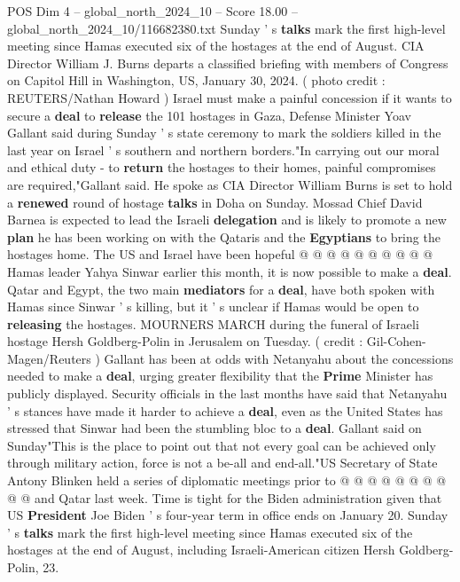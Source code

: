 \begin{textsample}{POS Dim 4 – global\_north\_2024\_10 – Score 18.00 – global\_north\_2024\_10/116682380.txt}  \label{ex:f4_pos_405}
Sunday ' s \textbf{talks} mark the first high-level meeting since Hamas executed six of the hostages at the end of August.
CIA Director William J.
Burns departs a classified briefing with members of Congress on Capitol Hill in Washington, US, January 30, 2024. ( photo credit : REUTERS/Nathan Howard ) Israel must make a painful concession if it wants to secure a \textbf{deal} to \textbf{release} the 101 hostages in Gaza, Defense Minister Yoav Gallant said during Sunday ' s state ceremony to mark the soldiers killed in the last year on Israel ' s southern and northern borders."In carrying out our moral and ethical duty - to \textbf{return} the hostages to their homes, painful compromises are required,"Gallant said.
He spoke as CIA Director William Burns is set to hold a \textbf{renewed} round of hostage \textbf{talks} in Doha on Sunday.
Mossad Chief David Barnea is expected to lead the Israeli \textbf{delegation} and is likely to promote a new \textbf{plan} he has been working on with the Qataris and the \textbf{Egyptians} to bring the hostages home.
The US and Israel have been hopeful @ @ @ @ @ @ @ @ @ @ Hamas leader Yahya Sinwar earlier this month, it is now possible to make a \textbf{deal}.
Qatar and Egypt, the two main \textbf{mediators} for a \textbf{deal}, have both spoken with Hamas since Sinwar ' s killing, but it ' s unclear if Hamas would be open to \textbf{releasing} the hostages.
MOURNERS MARCH during the funeral of Israeli hostage Hersh Goldberg-Polin in Jerusalem on Tuesday. ( credit : Gil-Cohen-Magen/Reuters ) Gallant has been at odds with Netanyahu about the concessions needed to make a \textbf{deal}, urging greater flexibility that the \textbf{Prime} Minister has publicly displayed.
Security officials in the last months have said that Netanyahu ' s stances have made it harder to achieve a \textbf{deal}, even as the United States has stressed that Sinwar had been the stumbling bloc to a \textbf{deal}.
Gallant said on Sunday"This is the place to point out that not every goal can be achieved only through military action, force is not a be-all and end-all."US Secretary of State Antony Blinken held a series of diplomatic meetings prior to @ @ @ @ @ @ @ @ @ @ and Qatar last week.
Time is tight for the Biden administration given that US \textbf{President} Joe Biden ' s four-year term in office ends on January 20.
Sunday ' s \textbf{talks} mark the first high-level meeting since Hamas executed six of the hostages at the end of August, including Israeli-American citizen Hersh Goldberg-Polin, 23.

\end{textsample}
